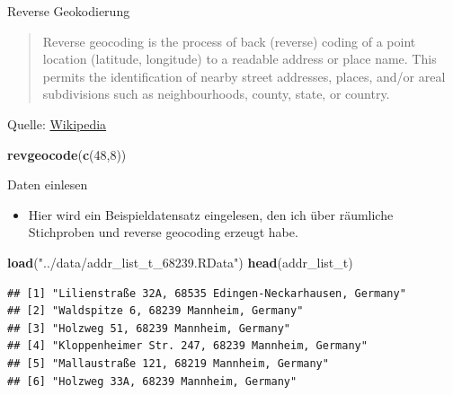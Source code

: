 \documentclass[ignorenonframetext,]{beamer}
\newenvironment{Shaded}{\begin{snugshade}}{\end{snugshade}}
\newcommand{\KeywordTok}[1]{\textcolor[rgb]{0.13,0.29,0.53}{\textbf{#1}}}
\newcommand{\DecValTok}[1]{\textcolor[rgb]{0.00,0.00,0.81}{#1}}
\newcommand{\StringTok}[1]{\textcolor[rgb]{0.31,0.60,0.02}{#1}}
\newcommand{\NormalTok}[1]{#1}
\providecommand{\tightlist}{%
  \setlength{\itemsep}{0pt}\setlength{\parskip}{0pt}}
\begin{document}
\begin{frame}[fragile]{Reverse Geokodierung}

\begin{quote}
Reverse geocoding is the process of back (reverse) coding of a point
location (latitude, longitude) to a readable address or place name. This
permits the identification of nearby street addresses, places, and/or
areal subdivisions such as neighbourhoods, county, state, or country.
\end{quote}

Quelle:
\href{https://en.wikipedia.org/wiki/Reverse_geocoding}{Wikipedia}

\begin{Shaded}
\begin{Highlighting}[]
\KeywordTok{revgeocode}\NormalTok{(}\KeywordTok{c}\NormalTok{(}\DecValTok{48}\NormalTok{,}\DecValTok{8}\NormalTok{))}
\end{Highlighting}
\end{Shaded}

\end{frame}

\begin{frame}[fragile]{Daten einlesen}

\begin{itemize}
\tightlist
\item
  Hier wird ein Beispieldatensatz eingelesen, den ich über räumliche
  Stichproben und reverse geocoding erzeugt habe.
\end{itemize}

\begin{Shaded}
\begin{Highlighting}[]
\KeywordTok{load}\NormalTok{(}\StringTok{"../data/addr_list_t_68239.RData"}\NormalTok{)}
\KeywordTok{head}\NormalTok{(addr_list_t)}
\end{Highlighting}
\end{Shaded}

\begin{verbatim}
## [1] "Lilienstraße 32A, 68535 Edingen-Neckarhausen, Germany"
## [2] "Waldspitze 6, 68239 Mannheim, Germany"                
## [3] "Holzweg 51, 68239 Mannheim, Germany"                  
## [4] "Kloppenheimer Str. 247, 68239 Mannheim, Germany"      
## [5] "Mallaustraße 121, 68219 Mannheim, Germany"            
## [6] "Holzweg 33A, 68239 Mannheim, Germany"
\end{verbatim}

\end{frame}
\end{document}
